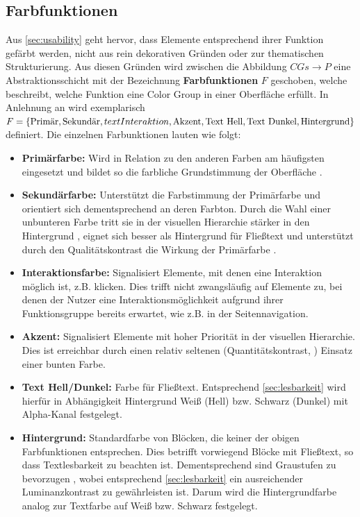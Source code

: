 \documentclass[11pt,a4paper,bibliography=totoc,twocolumn]{scrartcl}
\begin{document}
\subsection{Farbfunktionen}
Aus \autoref{sec:usability} geht hervor, dass Elemente entsprechend ihrer Funktion gefärbt werden, nicht aus rein dekorativen Gründen oder zur thematischen Strukturierung. Aus diesen Gründen wird zwischen die Abbildung $CGs \to P$ eine Abstraktionsschicht mit der Bezeichnung \textbf{Farbfunktionen} $F$ geschoben, welche beschreibt, welche Funktion eine Color Group in einer Oberfläche erfüllt. In Anlehnung an \citep{google,  smashing} wird exemplarisch $F = \{\text{Primär}, \text{Sekundär}, text{Interaktion}, \text{Akzent}, \text{Text Hell},\\ \text{Text Dunkel}, \text{Hintergrund}\}$ definiert. Die einzelnen Farbunktionen lauten wie folgt:
\begin{itemize}
	\item \textbf{Primärfarbe:} Wird in Relation zu den anderen Farben am häufigsten eingesetzt und bildet so die farbliche Grundstimmung der Oberfläche \citep{awwwards}.
	\item \textbf{Sekundärfarbe:} Unterstützt die Farbstimmung der Primärfarbe und orientiert sich dementsprechend an deren Farbton. Durch die Wahl einer unbunteren Farbe tritt sie in der visuellen Hierarchie stärker in den Hintergrund \citep{visual-hierarchy}, eignet sich besser als Hintergrund für Fließtext und unterstützt durch den Qualitätskontrast die Wirkung der Primärfarbe \citep{webdesign}.
	\item \textbf{Interaktionsfarbe:} Signalisiert Elemente, mit denen eine Interaktion möglich ist, z.B. klicken. Dies trifft nicht zwangsläufig auf Elemente zu, bei denen der Nutzer eine Interaktionsmöglichkeit aufgrund ihrer Funktionsgruppe bereits erwartet, wie z.B. in der Seitennavigation.
	\item \textbf{Akzent:} Signalisiert Elemente mit hoher Priorität in der visuellen Hierarchie. Dies ist erreichbar durch einen relativ seltenen (Quantitätskontrast, \citep{webdesign}) Einsatz einer bunten \citep{visual-hierarchy} Farbe.
	\item \textbf{Text Hell/Dunkel:} Farbe für Fließtext. Entsprechend \autoref{sec:lesbarkeit} wird hierfür in Abhängigkeit Hintergrund Weiß (Hell) bzw. Schwarz (Dunkel) mit Alpha-Kanal festgelegt.
	\item \textbf{Hintergrund:} Standardfarbe von Blöcken, die keiner der obigen Farbfunktionen entsprechen. Dies betrifft vorwiegend Blöcke mit Fließtext, so dass Textlesbarkeit zu beachten ist. Dementsprechend sind Graustufen zu bevorzugen \citep{webx0}, wobei entsprechend \autoref{sec:lesbarkeit} ein ausreichender Luminanzkontrast zu gewährleisten ist. Darum wird die Hintergrundfarbe analog zur Textfarbe auf Weiß bzw. Schwarz festgelegt.
\end{itemize}
\end{document}
